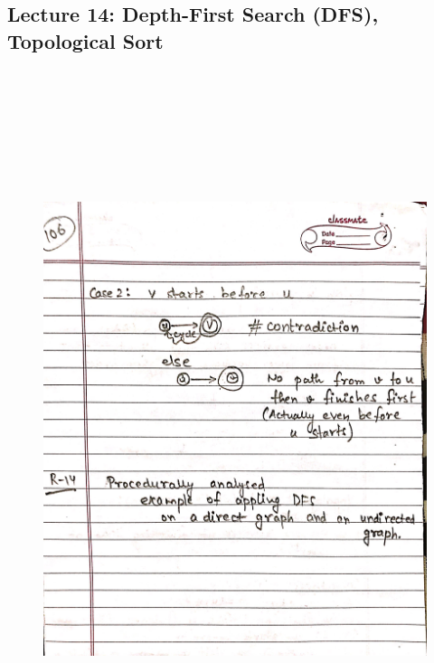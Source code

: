 \newpage
{\color{black} \subsection*{Lecture 14: Depth-First Search (DFS), Topological Sort}}
\begin{figure}[H]
    \centering
    \includegraphics[width=16cm, height=21cm]{"./MIT-6.006/MIT-6006-106"}
\end{figure}

